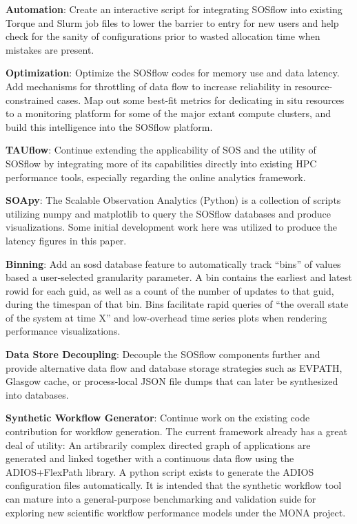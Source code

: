 \textbf{Automation}: Create an interactive script for integrating
SOSflow into existing Torque and Slurm job files to lower the barrier
to entry for new users and help check for the sanity of configurations
prior to wasted allocation time when mistakes are present.

\textbf{Optimization}: Optimize the SOSflow codes for memory use and
data latency. Add mechanisms for throttling of data flow to increase
reliability in resource-constrained cases. Map out some best-fit
metrics for dedicating in situ resources to a monitoring platform for
some of the major extant compute clusters, and build this intelligence
into the SOSflow platform.

\textbf{TAUflow}: Continue extending the applicability of SOS and
the utility of SOSflow by integrating more of its capabilities directly
into existing HPC performance tools, especially regarding the online
analytics framework.

\textbf{SOApy}: The Scalable Observation Analytics (Python) is a 
collection of scripts utilizing numpy and matplotlib to query the
SOSflow databases and produce visualizations. Some initial development
work here was utilized to produce the latency figures in this
paper.

\textbf{Binning}: Add an sosd database feature to automatically
track ``bins'' of values based a user-selected granularity
parameter. A bin contains the earliest and latest rowid for each guid,
as well as a count of the number of updates to that guid, during the
timespan of that bin. Bins facilitate rapid queries of ``the overall
state of the system at time X'' and low-overhead time series plots
when rendering performance visualizations.

\textbf{Data Store Decoupling}: Decouple the SOSflow components further
and provide alternative data flow and database storage strategies such
as EVPATH, Glasgow cache, or process-local JSON file dumps that can
later be synthesized into databases.

\textbf{Synthetic Workflow Generator}: Continue work on the existing
code contribution for workflow generation. The current framework
already has a great deal of utility: An artibrarily complex directed
graph of applications are generated and linked together with a
continuous data flow using the ADIOS+FlexPath library. A python script
exists to generate the ADIOS configuration files automatically. It is
intended that the synthetic workflow tool can mature into a
general-purpose benchmarking and validation suide for exploring new
scientific workflow performance models under the MONA project.

